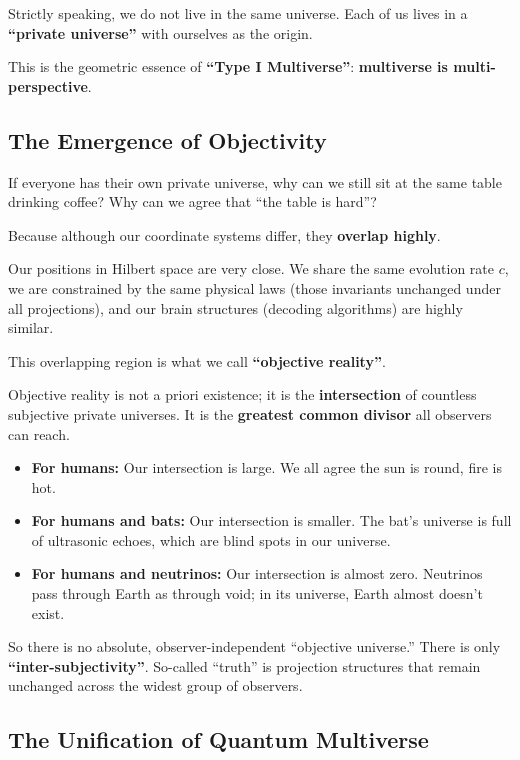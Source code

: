 Strictly speaking, we do not live in the same universe. Each of us lives in a \textbf{``private universe''} with ourselves as the origin.

This is the geometric essence of \textbf{``Type I Multiverse''}: \textbf{multiverse is multi-perspective}.

\subsection{The Emergence of Objectivity}

If everyone has their own private universe, why can we still sit at the same table drinking coffee? Why can we agree that ``the table is hard''?

Because although our coordinate systems differ, they \textbf{overlap highly}.

Our positions in Hilbert space are very close. We share the same evolution rate $c$, we are constrained by the same physical laws (those invariants unchanged under all projections), and our brain structures (decoding algorithms) are highly similar.

This overlapping region is what we call \textbf{``objective reality''}.

Objective reality is not a priori existence; it is the \textbf{intersection} of countless subjective private universes. It is the \textbf{greatest common divisor} all observers can reach.

\begin{itemize}
\item \textbf{For humans:} Our intersection is large. We all agree the sun is round, fire is hot.

\item \textbf{For humans and bats:} Our intersection is smaller. The bat's universe is full of ultrasonic echoes, which are blind spots in our universe.

\item \textbf{For humans and neutrinos:} Our intersection is almost zero. Neutrinos pass through Earth as through void; in its universe, Earth almost doesn't exist.
\end{itemize}

So there is no absolute, observer-independent ``objective universe.'' There is only \textbf{``inter-subjectivity''}. So-called ``truth'' is projection structures that remain unchanged across the widest group of observers.

\subsection{The Unification of Quantum Multiverse}

